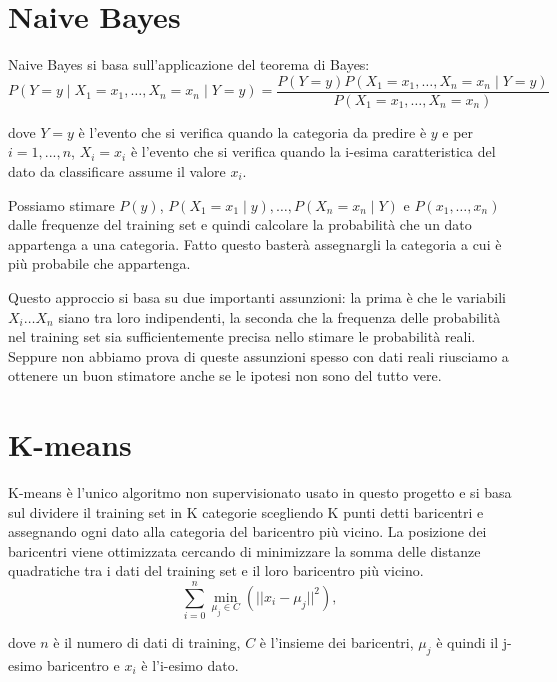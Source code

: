 \documentclass[a4paper,12pt]{report}
\begin{document}
\section{Naive Bayes}

Naive Bayes si basa sull'applicazione del teorema di Bayes:
$$
P(Y=y \mid X_1=x_1, \dots, X_n=x_n \mid Y=y) = \frac{P(Y=y) P(X_1=x_1, \dots, X_n=x_n \mid Y=y)}
                                 						{P(X_1=x_1, \dots, X_n=x_n)}
$$

dove $Y = y$ è l'evento che si verifica quando la categoria da predire è $y$ e
per $i = 1, ..., n$, $X_i = x_i$ è l'evento che si verifica quando la i-esima
caratteristica del dato da classificare assume il valore $x_i$. 


Possiamo stimare $P(y)$, $P(X_1 = x_1 \mid y), \dots, P(X_n = x_n \mid Y)$ e $P(x_1, \dots, x_n)$
dalle frequenze del training set e quindi calcolare la probabilità che un dato
appartenga a una categoria. Fatto questo basterà assegnargli la categoria a cui è
più probabile che appartenga.

Questo approccio si basa su due importanti assunzioni: la prima è che le
variabili $X_i \dots X_n$ siano tra loro indipendenti, la seconda che la
frequenza delle probabilità nel training set sia sufficientemente precisa nello
stimare le probabilità reali. Seppure non abbiamo prova di queste assunzioni
spesso con dati reali riusciamo a ottenere un buon stimatore anche se le ipotesi
non sono del tutto vere.

\section{K-means}

K-means è l'unico algoritmo non supervisionato usato in questo progetto e si
basa sul dividere il training set in K categorie scegliendo K punti detti
baricentri e assegnando ogni dato alla categoria del baricentro più vicino. La
posizione dei baricentri viene ottimizzata cercando di minimizzare la somma
delle distanze quadratiche tra i dati del training set e il loro baricentro più
vicino.
$$
\sum_{i=0}^{n}\min_{\mu_j \in C}(||x_i - \mu_j||^2),
$$

dove $n$ è il numero di dati di training, $C$ è l'insieme dei baricentri,
$\mu_j$ è quindi il j-esimo baricentro e $x_i$ è l'i-esimo dato.
\end{document}
